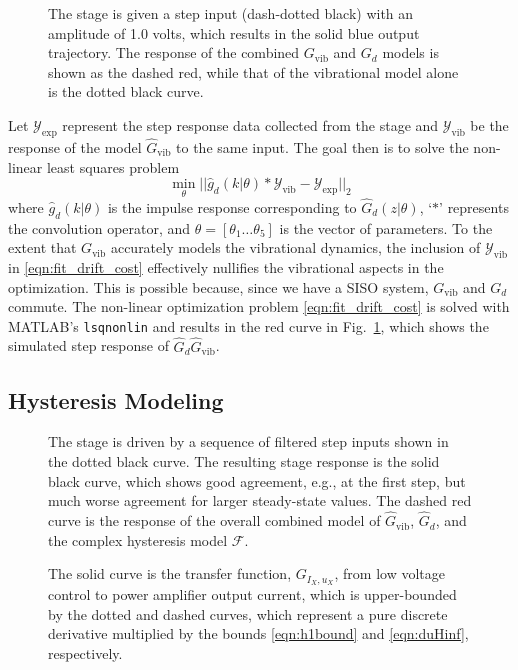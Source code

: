 \documentclass[twocolumn,twoside]{IEEEtran}
\newcommand{\Gv}{\ensuremath{G_{\text{vib}}}\xspace}
\newcommand{\hGv}{\ensuremath{\hat{G}_{\text{vib}}}\xspace}
\begin{document}
\begin{figure}
  
  \caption{The stage is given a step input (dash-dotted black) with an amplitude of 1.0 volts, which results in the solid blue output trajectory. The response of the combined $\Gv$ and $G_{d}$ models is shown as the dashed red, while that of the vibrational model alone is the dotted black curve.}
  \label{fig:drift_fit}
\end{figure}
Let $\mathcal{Y}_{\text{exp}}$ represent the step response data collected from the stage and  $\mathcal{Y}_{\text{vib}}$ be the response of the model $\hat{G}_{\textrm{vib}}$ to the same input. The goal then is to solve the non-linear least squares problem
\begin{equation}
  \min_{\theta}\bigl|\bigl| \hat{g}_d(k|\theta)*\mathcal{Y}_{\text{vib}} - \mathcal{Y}_{\text{exp}}\bigr|\bigr|_2
  \label{eqn:fit_drift_cost}
\end{equation}
where $\hat{g}_d(k|\theta)$ is the impulse response corresponding to $\hat{G}_d(z|\theta)$, `$*$' represents the convolution operator, and  ${\theta=[\theta_1\dots\theta_5]}$ is the vector of parameters. To the extent that $\Gv$ accurately models the vibrational dynamics, the inclusion of $\mathcal{Y}_{\text{vib}}$ in \eqref{eqn:fit_drift_cost} effectively nullifies the vibrational aspects in the optimization. This is possible because, since we have a SISO system, $\Gv$ and $G_d$ commute. 
The non-linear optimization problem \eqref{eqn:fit_drift_cost} is solved with MATLAB's \texttt{lsqnonlin} and results in the red curve in Fig.~\ref{fig:drift_fit}, which shows the simulated step response of $\hat{G}_d\hGv$. 

\subsection{Hysteresis Modeling}\label{sec:hyst_model}
\begin{figure}[ht!]
  \begin{minipage}{0.48\textwidth}
  
  \caption{The stage is driven by a sequence of filtered step inputs shown in the dotted black curve. The resulting stage response is the solid black curve, which shows good agreement, e.g., at the first step, but much worse agreement for larger steady-state values. The dashed red curve is the response of the overall combined model of $\hGv$, $\hat{G}_{d}$, and the complex hysteresis model $\mathcal{F}$.}
  \label{fig:hyst_resp_dem}
\end{minipage}
\hfill
\begin{minipage}{0.48\textwidth}
\centering

\caption{ The solid curve is the transfer function, $G_{I_X, u_X}$, from low voltage control to power amplifier output current, which is upper-bounded by the dotted and dashed curves, which represent a pure discrete derivative multiplied by the bounds \eqref{eqn:h1bound} and \eqref{eqn:duHinf}, respectively.}
\label{fig:powTF}
\end{minipage}
\end{figure}
\end{document}

